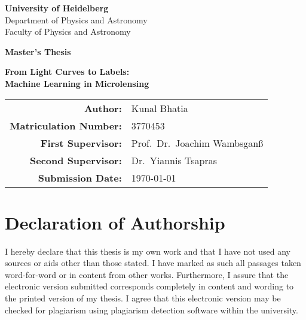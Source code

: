 \documentclass[
     12pt,         %
     a4paper,      %
     BCOR=10mm,    %
     DIV=14,       %
     twoside,      %
     openright,    %
     listof=totoc, %
     bibliography=totoc, %
     ]{scrreprt}
\begin{document}

\begin{titlepage}
\centering

\vspace*{2cm}

{\LARGE\textbf{University of Heidelberg}}\\[0.5cm]
{\Large Department of Physics and Astronomy}\\[0.5cm]
{\large Faculty of Physics and Astronomy}

\vspace{3cm}

{\Large\textbf{Master's Thesis}}

\vspace{1.5cm}

{\huge\bfseries From Light Curves to Labels:\\[0.3cm]
Machine Learning in Microlensing}

\vfill

{\large
\begin{tabular}{rl}
\textbf{Author:} & Kunal Bhatia \\[0.2cm]
\textbf{Matriculation Number:} & 3770453 \\[0.2cm]
\textbf{First Supervisor:} & Prof.~Dr.~Joachim Wambsganß \\[0.2cm]
\textbf{Second Supervisor:} & Dr.~Yiannis Tsapras \\[0.2cm]
\textbf{Submission Date:} & \today
\end{tabular}
}

\vspace{2cm}

\end{titlepage}


\cleardoublepage
\thispagestyle{empty}

\vspace*{100pt}

\section*{Declaration of Authorship}

\noindent
I hereby declare that this thesis is my own work and that I have not used any sources or aids other than those stated. I have marked as such all passages taken word-for-word or in content from other works. Furthermore, I assure that the electronic version submitted corresponds completely in content and wording to the printed version of my thesis. I agree that this electronic version may be checked for plagiarism using plagiarism detection software within the university.
\end{document}
